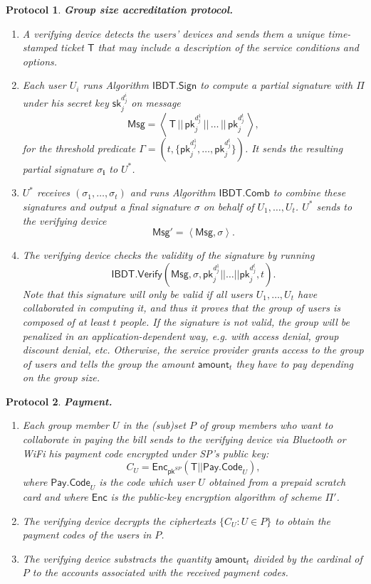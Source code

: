 \documentclass[11pt]{llncs}
\def\pk{\mathsf{pk}}
\def\sk{\mathsf{sk}}
\def\Msg{\mathsf{Msg}}
\newtheorem{proto}{Protocol}
\begin{document}
\begin{proto}
\textbf{Group size accreditation protocol.}\label{ab.proto.accr}
\begin{enumerate}
\item A verifying device detects the users' devices and sends them
a unique time-stamped ticket $\mathsf{T}$ that may include
a description of the service conditions and options.
\item Each user $U_i$ runs Algorithm  $\mathsf{IBDT.Sign}$ to compute a
partial signature with $\Pi$ under his secret key $\sk_{j}^{d_j^i}$ on
message
$$\Msg = \left\langle \, \mathsf{T} \, || \, \pk_{j}^{d_j^1} \, || \, \dots \, || \, \pk_{j}^{d_j^t} \, \right\rangle,$$
for the threshold predicate $\Gamma = (t, \{ \pk_{j}^{d_j^1}, \dots , \pk_{j}^{d_j^t} \})$.
It sends the resulting partial signature $\sigma_\mathbf{i}$ to $U^{*}$.
\item $U^{*}$ receives $(\sigma_1 , \dots , \sigma_t )$ and runs
Algorithm  $\mathsf{IBDT.Comb}$
to combine these signatures and output a final signature $\sigma$ on behalf of $U_1 , \dots , U_t$.
$U^{*}$ sends to the verifying device
$$\mathsf{Msg'} = \left\langle \mathsf{Msg}, \sigma \right\rangle .$$
\item The verifying device checks the validity of the signature by running
$$\mathsf{IBDT.Verify} ( \Msg, \sigma , \pk_j^{d_j^1} || \dots || \pk_j^{d_j^t}, t) . $$
Note that this signature will only be valid if all users $U_1 , \dots , U_t$ have collaborated in
computing it, and thus it proves that the group of users is composed of at least $t$ people.
If the signature is not valid, the group will be penalized in
an application-dependent way, {\em e.g.} with access denial,
group discount denial, etc.
Otherwise, the service provider grants access to the
group of users and tells the group the amount $\mathsf{amount}_t$
they have to pay
depending on the group size.
\end{enumerate}
\end{proto}

\begin{proto}
\textbf{Payment.}
\begin{enumerate}
\item Each group member $U$ in the (sub)set $P$ of group members
who want to collaborate
in paying the bill sends to the verifying device via Bluetooth or WiFi his payment code encrypted
under SP's public key:
$$C_U = \mathsf{Enc}_{\mathsf{pk}^{SP}} ( \mathsf{T} || \mathsf{Pay.Code}_U ),$$
where $\mathsf{Pay.Code}_U$ is the code which user $U$ obtained from a prepaid scratch card
and where $\mathsf{Enc}$ is the public-key encryption algorithm
of scheme $\Pi'$.
\item The verifying device decrypts the
ciphertexts $\{ C_U : U \in P \}$ to obtain the payment
codes of the users in $P$.
\item The verifying device substracts the quantity $\mathsf{amount}_t$ divided by the cardinal
of $P$ to the accounts associated with the received payment codes.
\end{enumerate}
\end{proto}
\end{document}
